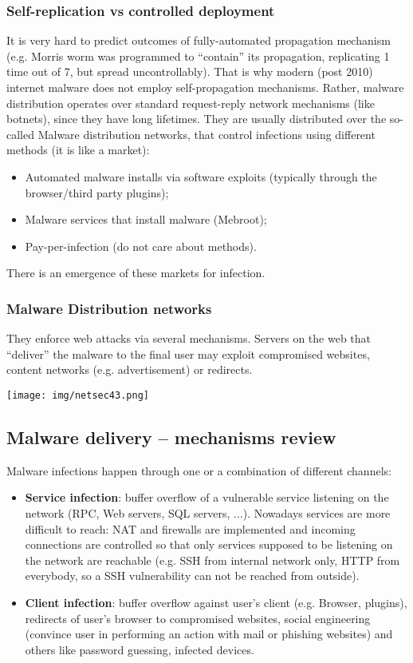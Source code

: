 \documentclass[a4paper, 10pt, titlepage]{article}
\begin{document}
\subsubsection*{Self-replication vs controlled deployment}
It is very hard to predict outcomes of fully-automated propagation mechanism (e.g. Morris worm was programmed to “contain” its propagation, replicating 1 time out of 7, but spread uncontrollably). That is why modern (post 2010) internet malware does not employ self-propagation mechanisms. Rather, malware distribution operates over standard request-reply network mechanisms (like botnets), since they have long lifetimes. They are usually distributed over the so-called Malware distribution networks, that control infections using different methods (it is like a market):
\begin{itemize}
	\item Automated malware installs via software exploits (typically through the browser/third party plugins);
	\item Malware services that install malware (Mebroot);
	\item Pay-per-infection (do not care about methods).
\end{itemize}
There is an emergence of these markets for infection.

\subsubsection*{Malware Distribution networks}
They enforce web attacks via several mechanisms. Servers on the web that “deliver” the malware to the final user may exploit compromised websites, content networks (e.g. advertisement) or redirects.
\begin{center}
	\texttt{[image: img/netsec43.png]}
\end{center}

\subsection{Malware delivery – mechanisms review}
Malware infections happen through one or a combination of different channels:
\begin{itemize}
	\item \textbf{Service infection}: buffer overflow of a vulnerable service listening on the network (RPC, Web servers, SQL servers, ...). Nowadays services are more difficult to reach: NAT and firewalls are implemented and incoming connections are controlled so that only services supposed to be listening on the network are reachable (e.g. SSH from internal network only, HTTP from everybody, so a SSH vulnerability can not be reached from outside).
	\item \textbf{Client infection}: buffer overflow against user’s client (e.g. Browser, plugins), redirects of user’s browser to compromised websites, social engineering (convince user in performing an action with mail or phishing websites) and others like password guessing, infected devices.
\end{itemize}
\end{document}
